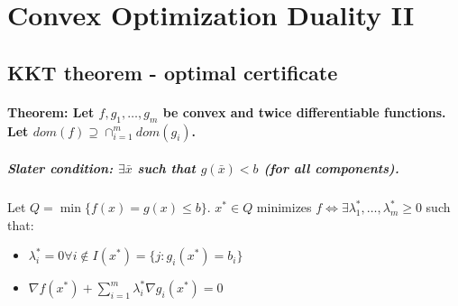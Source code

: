 \documentclass[main]{subfiles}
\begin{document}

\section{Convex Optimization Duality II}
\subsection{KKT theorem - optimal certificate}
\paragraph{Theorem: Let $f, g_{1}, \dots, g_{m}$ be convex and twice
differentiable functions. Let $dom(f) \supseteq \cap_{i = 1}^{m} dom (g_{i})$.}

\subparagraph{Slater condition: $\exists \bar{x}$ such that $ g( \bar{x} ) < b$
(for all components).}

Let $Q = \min \{ f(x) = g(x) \leq b \}$.
$x^{*} \in Q$ minimizes $f \iff \exists \lambda^{*}_{1}, \dots,
\lambda^{*}_{m} \geq 0$ such that:
\begin{itemize}
\item $\lambda^{*}_{i} = 0 \forall i \notin I(x^{*}) = \{j: g_i(x^*) = b_i\}$
\item $\nabla f(x^{*}) + \sum_{i=1}^m \lambda^{*}_{i} \nabla g_{i}(x^{*}) = 0$
\end{itemize}
\end{document}
